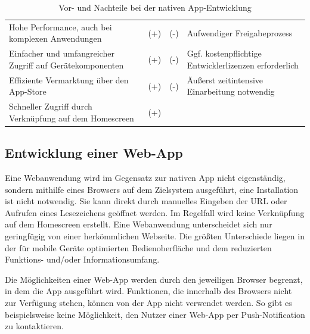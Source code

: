 \begin{table}[H]
  \begin{center}\small\renewcommand{\arraystretch}{1.4}\sffamily %
    \begin{tabulary}{\textwidth}{>{\raggedleft}m{61mm} *{2}{>{\ttfamily}m{5mm}} m{61mm}}
    	&	\\ \hline
    
    Hohe Performance, auch bei komplexen Anwendungen & (+) &
    (-) & Aufwendiger Freigabeprozess\\
    
    Einfacher und umfangreicher Zugriff auf Gerätekomponenten & (+) &
    (-) & Ggf. kostenpflichtige Entwicklerlizenzen erforderlich\\
    
    Effiziente Vermarktung über den App-Store & (+) & (-) & Äußerst zeitintensive Einarbeitung notwendig\\
    
    Schneller Zugriff durch Verknüpfung auf dem Homescreen & (+) & & \\

    \end{tabulary}        
    
    \caption{Vor- und Nachteile bei der nativen App-Entwicklung}
    \label{tab:procon-nativ}
  \end{center}
\end{table}

\subsection{Entwicklung einer Web-App}
Eine Webanwendung wird im Gegensatz zur nativen App nicht eigenständig, sondern mithilfe eines Browsers auf dem Zielsystem ausgeführt, eine Installation ist nicht notwendig. Sie kann direkt durch manuelles Eingeben der URL oder Aufrufen eines Lesezeichens geöffnet werden. Im Regelfall wird keine Verknüpfung auf dem Homescreen erstellt. Eine Webanwendung unterscheidet sich nur geringfügig von einer herkömmlichen Webseite. Die größten Unterschiede liegen in der für mobile Geräte optimierten Bedienoberfläche und dem reduzierten Funktions- und/oder Informationsumfang.

Die Möglichkeiten einer Web-App werden durch den jeweiligen Browser begrenzt, in dem die App ausgeführt wird. Funktionen, die innerhalb des Browsers nicht zur Verfügung stehen, können von der App nicht verwendet werden. So gibt es beispielsweise keine Möglichkeit, den Nutzer einer Web-App per Push-Notification zu kontaktieren. 

